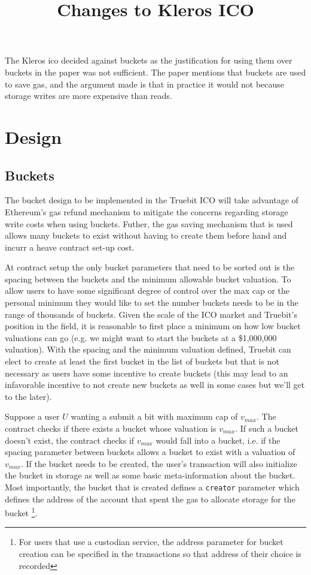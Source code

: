 \documentclass{article}
\title{Changes to Kleros ICO}
\begin{document}
\maketitle

The Kleros ico decided against buckets as the justification for using them over buckets in the paper was not sufficient. The paper mentions that buckets are used to save gas, and the argument made is that in practice it would not because storage writes are more expensive than reads.


\section{Design}

\subsection{Buckets}
The bucket design to be implemented in the Truebit ICO will take advantage of Ethereum's gas refund mechanism to mitigate the concerns regarding storage write costs when using buckets.
Futher, the gas saving mechanism that is used allows many buckets to exist without having to create them before hand and incurr a heave contract set-up cost.

At contract setup the only bucket parameters that need to be sorted out is the spacing between the buckets and the minimum allowable bucket valuation. 
To allow users to have some significant degree of control over the max cap or the personal minimum they would like to set the number buckets needs to be in the range of thousands of buckets.
Given the scale of the ICO market and Truebit's position in the field, it is reasonable to first place a minimum on how low bucket valuations can go (e.g. we might want to start the buckets at a \$1,000,000 valuation).
With the spacing and the minimum valuation defined, Truebit can elect to create at least the first bucket in the list of buckets but that is not necessary as users have some incentive to create buckets (this may lead to an infavorable incentive to not create new buckets as well in some cases but we'll get to the later).

Suppose a user $U$ wanting a submit a bit with maximum cap of $v_{max}$.
The contract checks if there exists a bucket whose valuation is $v_{max}$. 
If such a bucket doesn't exist, the contract checks if $v_{max}$ would fall into a bucket, i.e. if the spacing parameter between buckets allows a bucket to exist with a valuation of $v_{max}$. 
If the bucket needs to be created, the user's transaction will also initialize the bucket in storage as well as some basic meta-information about the bucket. 
Most importantly, the bucket that is created defines a \texttt{creator} parameter which defines the address of the account that spent the gas to allocate storage for the bucket \footnote{For users that use a custodian service, the address parameter for bucket creation can be specified in the transactions so that address of their choice is recorded}.
\end{document}
